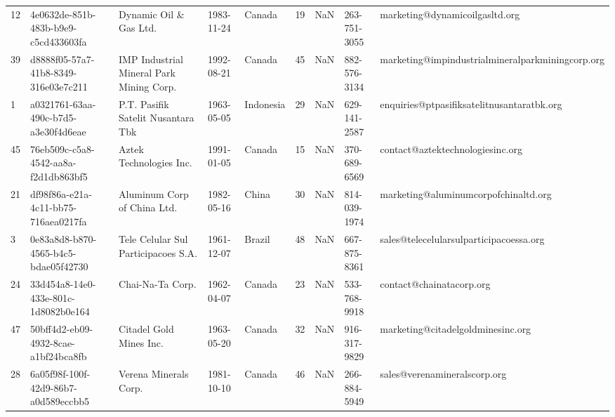 \begin{tabular}{lllllrrll}
12 &  4e0632de-851b-483b-b9e9-c5cd433603fa &                    Dynamic Oil \& Gas Ltd. &     1983-11-24 &           Canada &                  19 &      NaN &  263-751-3055 &                    marketing@dynamicoilgasltd.org \\
39 &  d8888f05-57a7-41b8-8349-316e03e7c211 &  IMP Industrial Mineral Park Mining Corp. &     1992-08-21 &           Canada &                  45 &      NaN &  882-576-3134 &  marketing@impindustrialmineralparkminingcorp.org \\
1  &  a0321761-63aa-490c-b7d5-a3e30f4d6eae &        P.T. Pasifik Satelit Nusantara Tbk &     1963-05-05 &        Indonesia &                  29 &      NaN &  629-141-2587 &        enquiries@ptpasifiksatelitnusantaratbk.org \\
45 &  76eb509c-c5a8-4542-aa8a-f2d1db863bf5 &                   Aztek Technologies Inc. &     1991-01-05 &           Canada &                  15 &      NaN &  370-689-6569 &                  contact@aztektechnologiesinc.org \\
21 &  df98f86a-e21a-4c11-bb75-716aea0217fa &               Aluminum Corp of China Ltd. &     1982-05-16 &            China &                  30 &      NaN &  814-039-1974 &              marketing@aluminumcorpofchinaltd.org \\
3  &  0e83a8d8-b870-4565-b4c5-bdae05f42730 &       Tele Celular Sul Participacoes S.A. &     1961-12-07 &           Brazil &                  48 &      NaN &  667-875-8361 &           sales@telecelularsulparticipacoessa.org \\
24 &  33d454a8-14e0-433e-801c-1d8082b0e164 &                          Chai-Na-Ta Corp. &     1962-04-07 &           Canada &                  23 &      NaN &  533-768-9918 &                          contact@chainatacorp.org \\
47 &  50bff4d2-eb09-4932-8cae-a1bf24bca8fb &                   Citadel Gold Mines Inc. &     1963-05-20 &           Canada &                  32 &      NaN &  916-317-9829 &                 marketing@citadelgoldminesinc.org \\
28 &  6a05f98f-100f-42d9-86b7-a0d589eccbb5 &                     Verena Minerals Corp. &     1981-10-10 &           Canada &                  46 &      NaN &  266-884-5949 &                      sales@verenamineralscorp.org \\
\bottomrule
\end{tabular}

